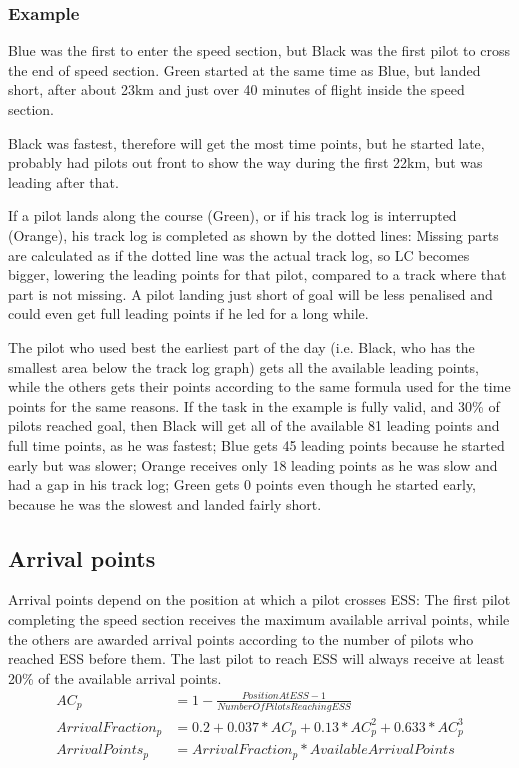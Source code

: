 \documentclass{article}
\begin{document}
\subsubsection{Example}
Blue was the first to enter the speed section, but Black was the first pilot to
cross the end of speed section. Green started at the same time as Blue, but
landed short, after about 23km and just over 40 minutes of flight inside the
speed section.

Black was fastest, therefore will get the most time points, but he started
late, probably had pilots out front to show the way during the first 22km, but
was leading after that.

If a pilot lands along the course (Green), or if his track log is interrupted
(Orange), his track log is completed as shown by the dotted lines: Missing
parts are calculated as if the dotted line was the actual track log, so LC
becomes bigger, lowering the leading points for that pilot, compared to a track
where that part is not missing. A pilot landing just short of goal will be less
penalised and could even get full leading points if he led for a long while.

The pilot who used best the earliest part of the day (i.e. Black, who has the
smallest area below the track log graph) gets all the available leading points,
while the others gets their points according to the same formula used for the
time points for the same reasons. If the task in the example is fully valid,
and 30\% of pilots reached goal, then Black will get all of the available 81
leading points and full time points, as he was fastest; Blue gets 45 leading
points because he started early but was slower; Orange receives only 18 leading
points as he was slow and had a gap in his track log; Green gets 0 points even
though he started early, because he was the slowest and landed fairly short.

\subsection{Arrival points}
\label{sec:arrival-points}
\begin{hg}
Arrival points depend on the position at which a pilot crosses ESS: The first
pilot completing the speed section receives the maximum available arrival
points, while the others are awarded arrival points according to the number of
pilots who reached ESS before them. The last pilot to reach ESS will always
receive at least 20\% of the available arrival points.
\begin{align*}
    AC_p &= 1 - \frac{PositionAtESS - 1}{NumberOfPilotsReachingESS} \\
    ArrivalFraction_p &= 0.2 + 0.037 * AC_p + 0.13 * AC_p^2 + 0.633 * AC_p^3 \\
    ArrivalPoints_p &= ArrivalFraction_p * AvailableArrivalPoints
\end{align*}
\end{hg}
\end{document}
